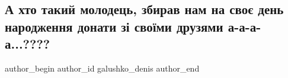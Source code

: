  
 
 
 
 

\subsection{А хто такий молодець, збирав нам на своє день народження донати зі своїми друзями а-а-а-а...????}
\label{sec:31_12_2022.fb.galushko_denis.2.a_khto_takii_molodet}

\ifcmt
 author_begin
   author_id galushko_denis
 author_end
\fi
